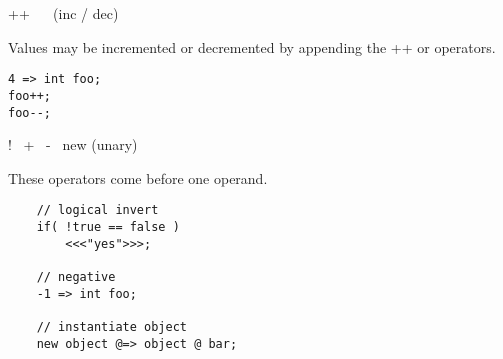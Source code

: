 ++~ \doubledash~ (inc / dec)

Values may be incremented or decremented by appending the ++ or \doubledash operators.
\begin{verbatim}
4 => int foo;
foo++;
foo--;
\end{verbatim}

!~ +~ -~ new (unary)

These operators come before one operand.
\begin{verbatim}
    // logical invert
    if( !true == false )
        <<<"yes">>>;

    // negative
    -1 => int foo;

    // instantiate object
    new object @=> object @ bar;
\end{verbatim}
